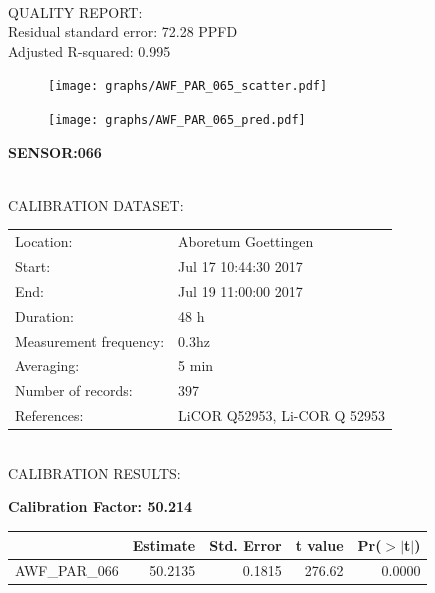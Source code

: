 \documentclass[oneside]{report}
\begin{document}
\hrulefill\\
QUALITY REPORT:\\
Residual standard error: 72.28 PPFD\\
Adjusted R-squared: 0.995



\begin{figure}[H]
  \centering
  \texttt{[image: graphs/AWF\_PAR\_065\_scatter.pdf]}
\end{figure}




\begin{figure}[H]
  \centering
  \texttt{[image: graphs/AWF\_PAR\_065\_pred.pdf]}
\end{figure}

\pagebreak


\begin{center}
\large{\textbf{SENSOR:066}}\\
\end{center}

\hrulefill\\
CALIBRATION DATASET:\\
\begin{table}[h!]
  \centering
  \label{tab:table1}
  \begin{tabular}{ll}
    Location: & Aboretum Goettingen\\ 
    
    
    Start:  & Jul 17 10:44:30 2017 \\
    End:   & Jul 19 11:00:00 2017\\ 
    Duration: & 48 h\\
    Measurement frequency: & 0.3hz\\
    Averaging:  &5 min\\
    Number of records: & 397 \\
    References: & LiCOR Q52953, Li-COR Q 52953 \\
  \end{tabular}
\end{table}

\hrulefill\\
CALIBRATION RESULTS:\\


\begin{center}
\textbf{\large{Calibration Factor: 50.214}}\\
\end{center}
\begin{table}[ht]
\centering
\begin{tabular}{rrrrr}
  \hline
 & Estimate & Std. Error & t value & Pr($>$$|$t$|$) \\ 
  \hline
AWF\_PAR\_066 & 50.2135 & 0.1815 & 276.62 & 0.0000 \\ 
   \hline
\end{tabular}
\end{table}
\end{document}
